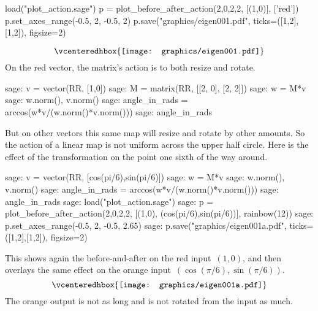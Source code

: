\begin{sagesilent}
load("plot_action.sage")  
p = plot_before_after_action(2,0,2,2, [(1,0)], ['red']) 
p.set_axes_range(-0.5, 2, -0.5, 2) 
p.save("graphics/eigen001.pdf", ticks=([1,2],[1,2]), figsize=2)
\end{sagesilent}
\begin{equation*}
  \vcenteredhbox{\texttt{[image: graphics/eigen001.pdf]}}
\end{equation*}
On the red vector, the matrix's action is to both resize and rotate.
\begin{sagecommandline}
sage: v = vector(RR, [1,0])
sage: M = matrix(RR, [[2, 0], [2, 2]])
sage: w = M*v
sage: w.norm(), v.norm() 
sage: angle_in_rads = arccos(w*v/(w.norm()*v.norm())) 
sage: angle_in_rads 
\end{sagecommandline}
But on
other vectors this same map will resize and rotate by other
amounts.
So the action of a linear map is not uniform across the upper half circle.
Here is the effect of the transformation on the point
one sixth of the way around.
\begin{sagecommandline}
sage: v = vector(RR, [cos(pi/6),sin(pi/6)])
sage: w = M*v
sage: w.norm(), v.norm() 
sage: angle_in_rads = arccos(w*v/(w.norm()*v.norm())) 
sage: angle_in_rads 
sage: load("plot_action.sage")  
sage: p = plot_before_after_action(2,0,2,2, [(1,0), (cos(pi/6),sin(pi/6))], rainbow(12)) 
sage: p.set_axes_range(-0.5, 2, -0.5, 2.65) 
sage: p.save("graphics/eigen001a.pdf", ticks=([1,2],[1,2]), figsize=2)
\end{sagecommandline}
This shows again the before-and-after on the red 
input~$(1,0)$, 
and then overlays the same effect on the orange 
input~$(\cos(\pi/6),\sin(\pi/6))$. 
\begin{equation*}
  \vcenteredhbox{\texttt{[image: graphics/eigen001a.pdf]}}
\end{equation*}
The orange output is not as long and is not rotated from the input as much.

